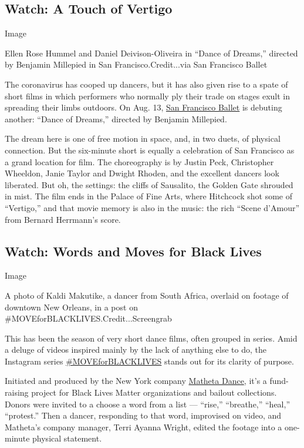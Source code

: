 \hypertarget{watch-a-touch-of-vertigo}{%
\subsection{Watch: A Touch of Vertigo}\label{watch-a-touch-of-vertigo}}

Image

Ellen Rose Hummel and Daniel Deivison-Oliveira in ``Dance of Dreams,''
directed by Benjamin Millepied in San Francisco.Credit...via San
Francisco Ballet

The coronavirus has cooped up dancers, but it has also given rise to a
spate of short films in which performers who normally ply their trade on
stages exult in spreading their limbs outdoors. On Aug. 13,
\href{https://www.sfballet.org/sf-ballet-home/}{San Francisco Ballet} is
debuting another: ``Dance of Dreams,'' directed by Benjamin Millepied.

The dream here is one of free motion in space, and, in two duets, of
physical connection. But the six-minute short is equally a celebration
of San Francisco as a grand location for film. The choreography is by
Justin Peck, Christopher Wheeldon, Janie Taylor and Dwight Rhoden, and
the excellent dancers look liberated. But oh, the settings: the cliffs
of Sausalito, the Golden Gate shrouded in mist. The film ends in the
Palace of Fine Arts, where Hitchcock shot some of ``Vertigo,'' and that
movie memory is also in the music: the rich ``Scene d'Amour'' from
Bernard Herrmann's score.

\hypertarget{watch-words-and-moves-for-black-lives}{%
\subsection{Watch: Words and Moves for Black
Lives}\label{watch-words-and-moves-for-black-lives}}

Image

A photo of Kaldi Makutike, a dancer from South Africa, overlaid on
footage of downtown New Orleans, in a post on
\#MOVEforBLACKLIVES.Credit...Screengrab

This has been the season of very short dance films, often grouped in
series. Amid a deluge of videos inspired mainly by the lack of anything
else to do, the Instagram series
\href{https://www.instagram.com/explore/tags/moveforblacklives/}{\#MOVEforBLACKLIVES}
stands out for its clarity of purpose.

Initiated and produced by the New York company
\href{http://mathetadance.com/}{Matheta Dance}, it's a fund-raising
project for Black Lives Matter organizations and bailout collections.
Donors were invited to a choose a word from a list --- ``rise,''
``breathe,'' ``heal,'' ``protest.'' Then a dancer, responding to that
word, improvised on video, and Matheta's company manager, Terri Ayanna
Wright, edited the footage into a one-minute physical statement.


